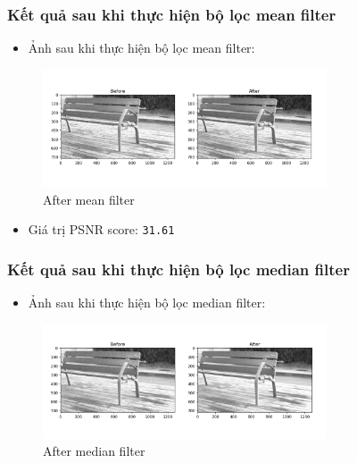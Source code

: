 \documentclass{article}
\begin{document}
\subsubsection{Kết quả sau khi thực hiện bộ lọc mean filter}
\begin{itemize}
    \item Ảnh sau khi thực hiện bộ lọc mean filter:
\end{itemize}

\begin{figure}[H]
    \centering
    \includegraphics[width=0.75\textwidth]{before-after-mean}
    \caption{After mean filter}
    \label{before-after-mean}
\end{figure}

\begin{itemize}
    \item Giá trị PSNR score: \lstinline{31.61}
\end{itemize}

\subsubsection{Kết quả sau khi thực hiện bộ lọc median filter}
\begin{itemize}
    \item Ảnh sau khi thực hiện bộ lọc median filter:
\end{itemize}

\begin{figure}[H]
    \centering
    \includegraphics[width=0.75\textwidth]{before-after-median}
    \caption{After median filter}
    \label{before-after-median}
\end{figure}
\end{document}
